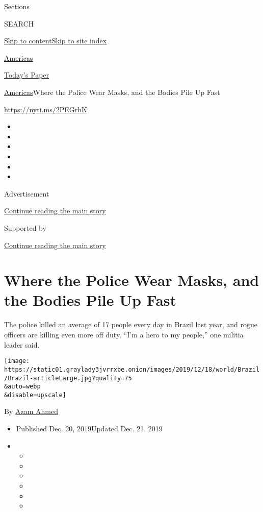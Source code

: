 Sections

SEARCH

\protect\hyperlink{site-content}{Skip to
content}\protect\hyperlink{site-index}{Skip to site index}

\href{https://www.nytimes3xbfgragh.onion/section/world/americas}{Americas}

\href{https://myaccount.nytimes3xbfgragh.onion/auth/login?response_type=cookie\&client_id=vi}{}

\href{https://www.nytimes3xbfgragh.onion/section/todayspaper}{Today's
Paper}

\href{/section/world/americas}{Americas}\textbar{}Where the Police Wear
Masks, and the Bodies Pile Up Fast

\url{https://nyti.ms/2PEGrhK}

\begin{itemize}
\item
\item
\item
\item
\item
\item
\end{itemize}

Advertisement

\protect\hyperlink{after-top}{Continue reading the main story}

Supported by

\protect\hyperlink{after-sponsor}{Continue reading the main story}

\hypertarget{where-the-police-wear-masks-and-the-bodies-pile-up-fast}{%
\section{Where the Police Wear Masks, and the Bodies Pile Up
Fast}\label{where-the-police-wear-masks-and-the-bodies-pile-up-fast}}

The police killed an average of 17 people every day in Brazil last year,
and rogue officers are killing even more off duty. ``I'm a hero to my
people,'' one militia leader said.

\texttt{[image: https://static01.graylady3jvrrxbe.onion/images/2019/12/18/world/Brazil/Brazil-articleLarge.jpg?quality=75\\\&auto=webp\\\&disable=upscale]}

By \href{https://www.nytimes3xbfgragh.onion/by/azam-ahmed}{Azam Ahmed}

\begin{itemize}
\item
  Published Dec. 20, 2019Updated Dec. 21, 2019
\item
  \begin{itemize}
  \item
  \item
  \item
  \item
  \item
  \item
  \end{itemize}
\end{itemize}

